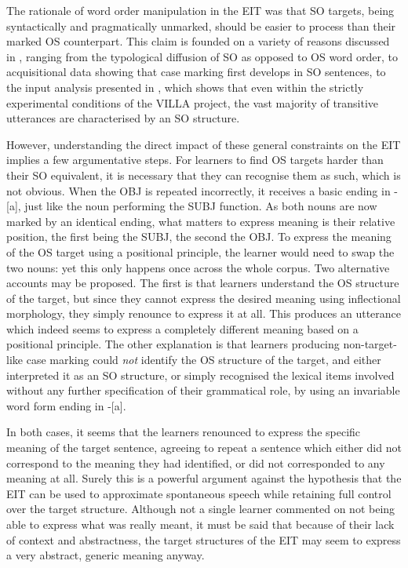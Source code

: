 The rationale of word order manipulation in the EIT was that SO targets, being syntactically and pragmatically unmarked, should be easier to process than their marked OS counterpart. This claim is founded on a variety of reasons discussed in , ranging from the typological diffusion of SO as opposed to OS word order, to acquisitional data showing that case marking first develops in SO sentences, to the input analysis presented in , which shows that even within the strictly experimental conditions of the VILLA project, the vast majority of transitive utterances are characterised by an SO structure.

However, understanding the direct impact of these general constraints on the EIT implies a few argumentative steps. For learners to find OS targets harder than their SO equivalent, it is necessary that they can recognise them as such, which is not obvious. When the OBJ is repeated incorrectly, it receives a basic ending in -[a], just like the noun performing the SUBJ function. As both nouns are now marked by an identical ending, what matters to express meaning is their relative position, the first being the SUBJ, the second the OBJ. To express the meaning of the OS target using a positional principle, the learner would need to swap the two nouns: yet this only happens once across the whole corpus. Two alternative accounts may be proposed. The first is that learners understand the OS structure of the target, but since they cannot express the desired meaning using inflectional morphology, they simply renounce to express it at all. This produces an utterance which indeed seems to express a completely different meaning based on a positional principle. The other explanation is that learners producing non-target-like case marking could \textit{not} identify the OS structure of the target, and either interpreted it as an SO structure, or simply recognised the lexical items involved without any further specification of their grammatical role, by using an invariable word form ending in -[a]. 

In both cases, it seems that the learners renounced to express the specific meaning of the target sentence, agreeing to repeat a sentence which either did not correspond to the meaning they had identified, or did not corresponded to any meaning at all. Surely this is a powerful argument against the hypothesis that the EIT can be used to approximate spontaneous speech while retaining full control over the target structure. Although not a single learner commented on not being able to express what was really meant, it must be said that because of their lack of context and abstractness, the target structures of the EIT may seem to express a very abstract, generic meaning anyway. 


